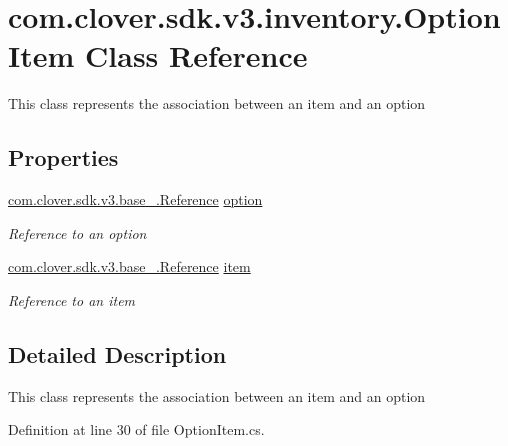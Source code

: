 \hypertarget{classcom_1_1clover_1_1sdk_1_1v3_1_1inventory_1_1_option_item}{}\section{com.\+clover.\+sdk.\+v3.\+inventory.\+Option\+Item Class Reference}
\label{classcom_1_1clover_1_1sdk_1_1v3_1_1inventory_1_1_option_item}


This class represents the association between an item and an option  


\subsection*{Properties}
\begin{DoxyCompactItemize}
\item 
\hyperlink{classcom_1_1clover_1_1sdk_1_1v3_1_1base___1_1_reference}{com.\+clover.\+sdk.\+v3.\+base\+\_\+.\+Reference} \hyperlink{classcom_1_1clover_1_1sdk_1_1v3_1_1inventory_1_1_option_item_ab9113ba4bd277f3e8735999fab21c6ca}{option}
\begin{DoxyCompactList}\small\item\em Reference to an option \end{DoxyCompactList}\item 
\hyperlink{classcom_1_1clover_1_1sdk_1_1v3_1_1base___1_1_reference}{com.\+clover.\+sdk.\+v3.\+base\+\_\+.\+Reference} \hyperlink{classcom_1_1clover_1_1sdk_1_1v3_1_1inventory_1_1_option_item_abf28f5c0ed9815e1a81cb41b67ff1167}{item}
\begin{DoxyCompactList}\small\item\em Reference to an item \end{DoxyCompactList}\end{DoxyCompactItemize}


\subsection{Detailed Description}
This class represents the association between an item and an option 



Definition at line 30 of file Option\+Item.\+cs.



